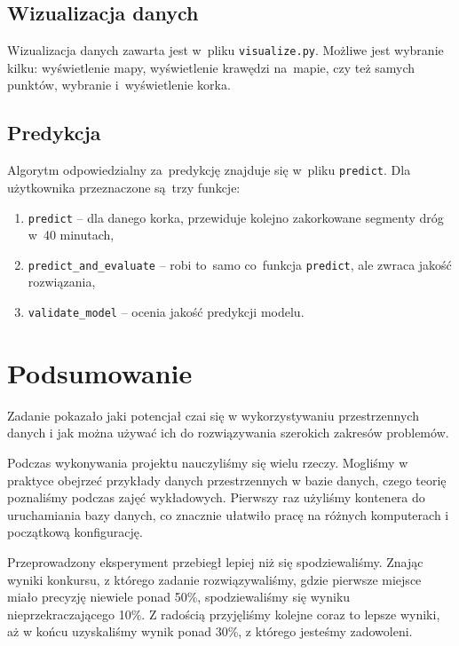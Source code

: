 \documentclass[a4paper,12pt]{mwart}
\begin{document}
\subsection{Wizualizacja danych}
Wizualizacja danych zawarta jest w~pliku \verb+visualize.py+. Możliwe jest wybranie kilku: wyświetlenie mapy, wyświetlenie krawędzi na~mapie, czy też samych punktów, wybranie i~wyświetlenie korka.

\subsection{Predykcja}
Algorytm odpowiedzialny za~predykcję znajduje się w~pliku \verb+predict+. Dla użytkownika przeznaczone są~trzy funkcje:
\begin{enumerate}
\item \verb+predict+ -- dla danego korka, przewiduje kolejno zakorkowane segmenty dróg w~40 minutach,
\item \verb+predict_and_evaluate+ -- robi to~samo co~funkcja \verb+predict+, ale zwraca jakość rozwiązania,
\item \verb+validate_model+ -- ocenia jakość predykcji modelu.
\end{enumerate}

\section{Podsumowanie}
Zadanie pokazało jaki potencjał czai się w wykorzystywaniu przestrzennych danych i jak można używać ich do rozwiązywania szerokich zakresów problemów.

Podczas wykonywania projektu nauczyliśmy się wielu rzeczy. Mogliśmy w praktyce obejrzeć przykłady danych przestrzennych w bazie danych, czego teorię poznaliśmy podczas zajęć wykładowych. Pierwszy raz użyliśmy kontenera do uruchamiania bazy danych, co znacznie ułatwiło pracę na różnych komputerach i początkową konfigurację.

Przeprowadzony eksperyment przebiegł lepiej niż się spodziewaliśmy. Znając wyniki konkursu, z którego zadanie rozwiązywaliśmy, gdzie pierwsze miejsce miało precyzję niewiele ponad 50\%, spodziewaliśmy się wyniku nieprzekraczającego 10\%. Z radością przyjęliśmy kolejne coraz to lepsze wyniki, aż w końcu uzyskaliśmy wynik ponad 30\%, z którego jesteśmy zadowoleni.
\end{document}
